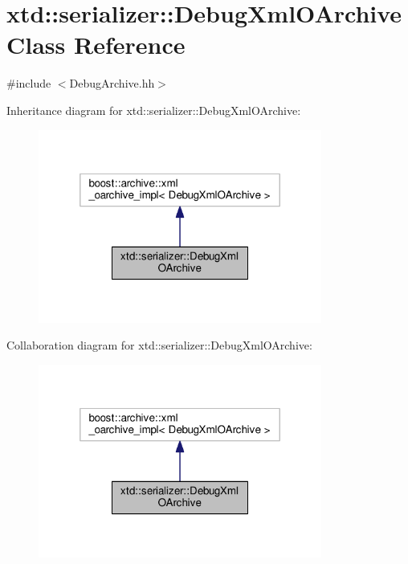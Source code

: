 \hypertarget{classxtd_1_1serializer_1_1DebugXmlOArchive}{\section{xtd\-:\-:serializer\-:\-:Debug\-Xml\-O\-Archive Class Reference}
\label{classxtd_1_1serializer_1_1DebugXmlOArchive}
}


{\ttfamily \#include $<$Debug\-Archive.\-hh$>$}



Inheritance diagram for xtd\-:\-:serializer\-:\-:Debug\-Xml\-O\-Archive\-:
\nopagebreak
\begin{figure}[H]
\begin{center}
\leavevmode
\includegraphics[width=264pt]{classxtd_1_1serializer_1_1DebugXmlOArchive__inherit__graph}
\end{center}
\end{figure}


Collaboration diagram for xtd\-:\-:serializer\-:\-:Debug\-Xml\-O\-Archive\-:
\nopagebreak
\begin{figure}[H]
\begin{center}
\leavevmode
\includegraphics[width=264pt]{classxtd_1_1serializer_1_1DebugXmlOArchive__coll__graph}
\end{center}
\end{figure}
